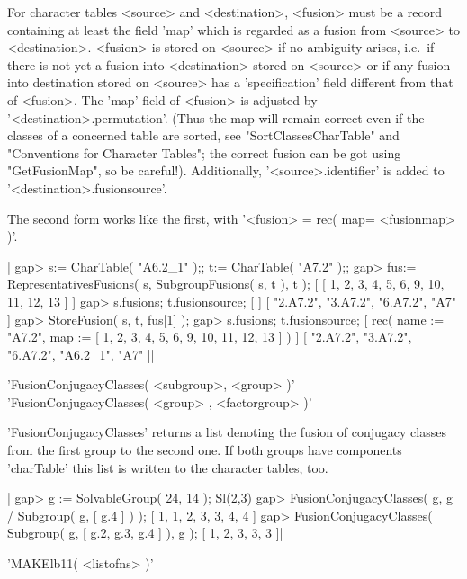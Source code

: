For character tables <source> and <destination>, <fusion> must be a
record containing at least the field 'map' which is regarded as a fusion
from <source> to <destination>.
<fusion> is stored on <source> if no ambiguity arises, i.e.\ if there is
not yet a fusion into <destination> stored on <source> or if any fusion
into destination stored on <source> has a 'specification' field different
from that of <fusion>.
The 'map' field of <fusion> is adjusted by '<destination>.permutation'.
(Thus the map will remain correct even if the classes of a concerned
table are sorted, see "SortClassesCharTable" and "Conventions for
Character Tables"; the
correct fusion can be got using "GetFusionMap", so be careful!).
Additionally, '<source>.identifier' is added to
'<destination>.fusionsource'.

The second form works like the first, with
'<fusion> = rec( map\:= <fusionmap> )'.

|    gap> s:= CharTable( "A6.2_1" );; t:= CharTable( "A7.2" );;
    gap> fus:= RepresentativesFusions( s, SubgroupFusions( s, t ), t );
    [ [ 1, 2, 3, 4, 5, 6, 9, 10, 11, 12, 13 ] ]
    gap> s.fusions; t.fusionsource;
    [  ]
    [ "2.A7.2", "3.A7.2", "6.A7.2", "A7" ]
    gap> StoreFusion( s, t, fus[1] );
    gap> s.fusions; t.fusionsource;
    [ rec(
          name := "A7.2",
          map := [ 1, 2, 3, 4, 5, 6, 9, 10, 11, 12, 13 ] ) ]
    [ "2.A7.2", "3.A7.2", "6.A7.2", "A6.2_1", "A7" ]|


'FusionConjugacyClasses( <subgroup>, <group>       )'\\
'FusionConjugacyClasses( <group>   , <factorgroup> )'

'FusionConjugacyClasses' returns a list denoting the fusion of
conjugacy classes from
the  first  group  to the  second one.   If both  groups  have components
'charTable' this list is written to the character tables, too.

|    gap> g := SolvableGroup( 24, 14 );
    Sl(2,3)
    gap> FusionConjugacyClasses( g, g / Subgroup( g, [ g.4 ] ) );
    [ 1, 1, 2, 3, 3, 4, 4 ]
    gap> FusionConjugacyClasses( Subgroup( g, [ g.2, g.3, g.4 ] ), g );
    [ 1, 2, 3, 3, 3 ]|

%

'MAKElb11( <listofns> )'

